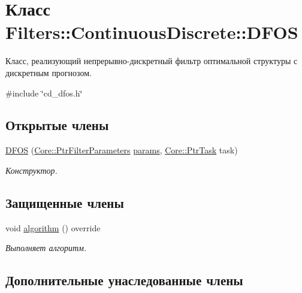 \hypertarget{class_filters_1_1_continuous_discrete_1_1_d_f_o_s}{}\section{Класс Filters\+:\+:Continuous\+Discrete\+:\+:D\+F\+OS}
\label{class_filters_1_1_continuous_discrete_1_1_d_f_o_s}


Класс, реализующий непрерывно-\/дискретный фильтр оптимальной структуры с дискретным прогнозом.  




{\ttfamily \#include \char`\"{}cd\+\_\+dfos.\+h\char`\"{}}

\subsection*{Открытые члены}
\begin{DoxyCompactItemize}
\item 
\hypertarget{class_filters_1_1_continuous_discrete_1_1_d_f_o_s_a962505dc3f59ef8b68cb228b1cf481f1}{}\label{class_filters_1_1_continuous_discrete_1_1_d_f_o_s_a962505dc3f59ef8b68cb228b1cf481f1} 
\hyperlink{class_filters_1_1_continuous_discrete_1_1_d_f_o_s_a962505dc3f59ef8b68cb228b1cf481f1}{D\+F\+OS} (\hyperlink{namespace_core_a4811af8148ba137d644b9a61a042cf03}{Core\+::\+Ptr\+Filter\+Parameters} \hyperlink{class_core_1_1_filter_a44aa749b49ba46256975ce545531ecf7}{params}, \hyperlink{namespace_core_abfda8f69fcacfcea2696549b548ed737}{Core\+::\+Ptr\+Task} task)
\begin{DoxyCompactList}\small\item\em Конструктор. \end{DoxyCompactList}\end{DoxyCompactItemize}
\subsection*{Защищенные члены}
\begin{DoxyCompactItemize}
\item 
void \hyperlink{class_filters_1_1_continuous_discrete_1_1_d_f_o_s_a532847e55043544b0ea50fd5744939c1}{algorithm} () override
\begin{DoxyCompactList}\small\item\em Выполняет алгоритм. \end{DoxyCompactList}\end{DoxyCompactItemize}
\subsection*{Дополнительные унаследованные члены}


